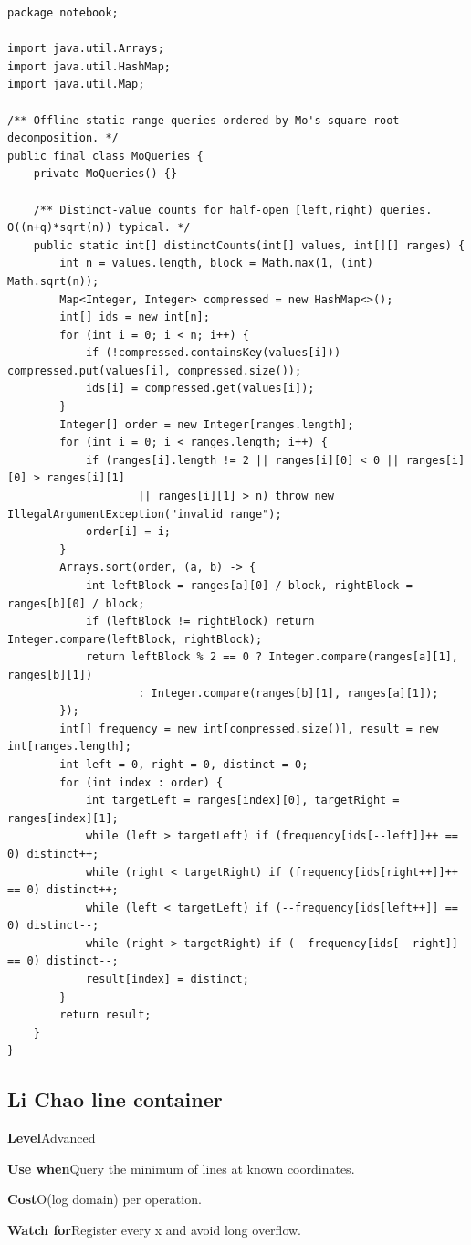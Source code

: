 \documentclass[10pt,letterpaper]{article}
\newcommand{\entrylabel}[1]{\textcolor{accent}{\bfseries #1}}
\begin{document}
\begin{lstlisting}
package notebook;

import java.util.Arrays;
import java.util.HashMap;
import java.util.Map;

/** Offline static range queries ordered by Mo's square-root decomposition. */
public final class MoQueries {
    private MoQueries() {}

    /** Distinct-value counts for half-open [left,right) queries. O((n+q)*sqrt(n)) typical. */
    public static int[] distinctCounts(int[] values, int[][] ranges) {
        int n = values.length, block = Math.max(1, (int) Math.sqrt(n));
        Map<Integer, Integer> compressed = new HashMap<>();
        int[] ids = new int[n];
        for (int i = 0; i < n; i++) {
            if (!compressed.containsKey(values[i])) compressed.put(values[i], compressed.size());
            ids[i] = compressed.get(values[i]);
        }
        Integer[] order = new Integer[ranges.length];
        for (int i = 0; i < ranges.length; i++) {
            if (ranges[i].length != 2 || ranges[i][0] < 0 || ranges[i][0] > ranges[i][1]
                    || ranges[i][1] > n) throw new IllegalArgumentException("invalid range");
            order[i] = i;
        }
        Arrays.sort(order, (a, b) -> {
            int leftBlock = ranges[a][0] / block, rightBlock = ranges[b][0] / block;
            if (leftBlock != rightBlock) return Integer.compare(leftBlock, rightBlock);
            return leftBlock % 2 == 0 ? Integer.compare(ranges[a][1], ranges[b][1])
                    : Integer.compare(ranges[b][1], ranges[a][1]);
        });
        int[] frequency = new int[compressed.size()], result = new int[ranges.length];
        int left = 0, right = 0, distinct = 0;
        for (int index : order) {
            int targetLeft = ranges[index][0], targetRight = ranges[index][1];
            while (left > targetLeft) if (frequency[ids[--left]]++ == 0) distinct++;
            while (right < targetRight) if (frequency[ids[right++]]++ == 0) distinct++;
            while (left < targetLeft) if (--frequency[ids[left++]] == 0) distinct--;
            while (right > targetRight) if (--frequency[ids[--right]] == 0) distinct--;
            result[index] = distinct;
        }
        return result;
    }
}
\end{lstlisting}
\subsection{Li Chao line container}
\begin{guidebox}\small
\entrylabel{Level}\quad Advanced\par
\entrylabel{Use when}\quad Query the minimum of lines at known coordinates.\par
\entrylabel{Cost}\quad O(log domain) per operation.\par
\entrylabel{Watch for}\quad Register every x and avoid long overflow.\par
\end{guidebox}
\end{document}
